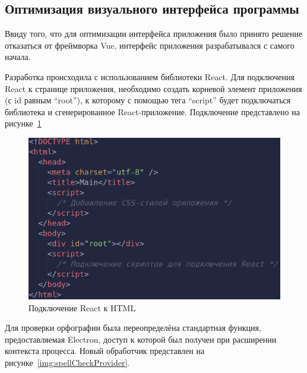 \subsection{Оптимизация визуального интерфейса программы}

Ввиду того, что для оптимизации интерфейса приложения было принято решение отказаться от фреймворка Vue, интерфейс приложения разрабатывался с самого начала.

Разработка происходила с использованием библиотеки React. Для подключения React к странице приложения, необходимо создать корневой элемент приложения (с id равным ``root''), к которому с помощью тега ``script'' будет подключаться библиотека и сгенерированное React-приложение. Подключение представлено на рисунке~\ref{img:reactHTML}

\begin{figure}[H]
  \centering
  \includegraphics[height=0.2\textheight]{assets/images/practical/reactHTML.png}
  \caption{Подключение React к HTML}
  \label{img:reactHTML}
\end{figure}

Для проверки орфографии была переопределёна стандартная функция, предоставляемая Electron, доступ к которой был получен при расширении контекста процесса. Новый обработчик представлен на рисунке~\ref{img:spellCheckProvider}.


